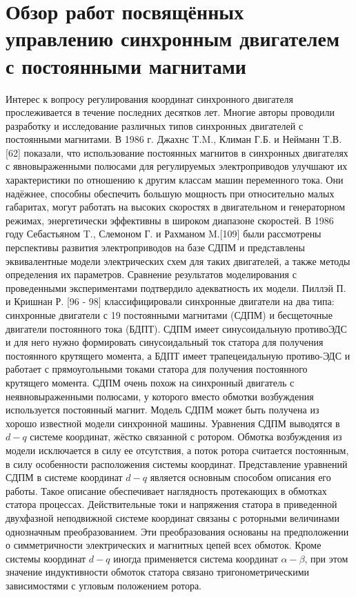 \section{Обзор работ посвящённых управлению синхронным двигателем с постоянными магнитами} \label{sec:ch1/sec4}

Интерес к вопросу регулирования координат синхронного двигателя прослеживается в течение последних десятков лет. Многие авторы проводили разработку и исследование различных типов синхронных двигателей с постоянными магнитами.
В 1986 г. Джахнс T.M., Климан Г.Б. и Нейманн T.В. [62] показали, что использование постоянных магнитов в синхронных двигателях с явновыраженными полюсами для регулируемых электроприводов улучшают их характеристики по отношению к другим классам машин переменного тока. Они надёжнее, способны обеспечить большую мощность при относительно малых габаритах, могут работать на высоких скоростях в двигательном и генераторном режимах, энергетически эффективны в широком диапазоне скоростей.
В 1986 году Себастьяном T., Слемоном Г. и Рахманом M.[109] были рассмотрены перспективы развития электроприводов на базе СДПМ и представлены эквивалентные модели электрических схем для таких двигателей, а также методы определения их параметров. Сравнение результатов моделирования с проведенными экспериментами подтвердило адекватность их модели. 
Пиллэй П. и Кришнан Р. [96 - 98] классифицировали синхронные двигатели на два типа: синхронные двигатели с 19 постоянными магнитами (СДПМ) и бесщеточные двигатели постоянного тока (БДПТ). СДПМ имеет синусоидальную противоЭДС и для него нужно формировать синусоидальный ток статора для получения постоянного крутящего момента, а БДПТ имеет трапецеидальную противо-ЭДС и работает с прямоугольными токами статора для получения постоянного крутящего момента. СДПМ очень похож на синхронный двигатель с неявновыраженными полюсами, у которого вместо обмотки возбуждения используется постоянный магнит.
Модель СДПМ может быть получена из хорошо известной модели синхронной машины. Уравнения СДПМ выводятся в $d-q$ системе координат, жёстко связанной с ротором. Обмотка возбуждения из модели исключается в силу ее отсутствия, а поток ротора считается постоянным, в силу особенности расположения системы координат. 
Представление уравнений СДПМ в системе координат $d-q$ является основным способом описания его работы. Такое описание обеспечивает наглядность протекающих в обмотках статора процессах. Действительные токи и напряжения статора в приведенной двухфазной неподвижной системе координат связаны с роторными величинами однозначным преобразованием. Эти преобразования основаны на предположении о симметричности электрических и магнитных цепей всех обмоток. Кроме системы координат $d-q$ иногда применяется система координат $\alpha-\beta$, при этом значение индуктивности обмоток статора связано тригонометрическими зависимостями с угловым положением ротора. 
